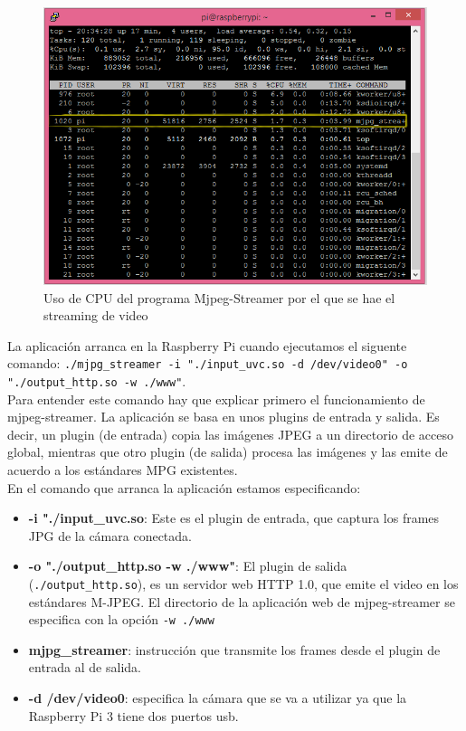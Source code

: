 \documentclass[twoside, 11pt]{epstfg}
\begin{document}
\begin{figure}[h!]
	\centerline{
		\mbox{\includegraphics[width=.80\textwidth]{images/UsoCPUMjpeg.png}}
	}
	\caption{Uso de CPU del programa Mjpeg-Streamer por el que se hae el streaming de video}
	\label{mjpeg}
\end{figure}

La aplicación arranca en la Raspberry Pi cuando ejecutamos el siguente comando: \texttt{./mjpg\_streamer -i "./input\_uvc.so -d /dev/video0" -o "./output\_http.so -w ./www"}.\\Para entender este comando hay que explicar primero el funcionamiento de mjpeg-streamer. La aplicación se basa en unos plugins de entrada y salida. Es decir, un plugin (de entrada) copia las imágenes JPEG a un directorio de acceso global, mientras que otro plugin (de salida) procesa las imágenes y las emite de acuerdo a los estándares MPG existentes.\\ En el comando que arranca la aplicación estamos especificando:
\begin{itemize}
	\item \textbf{ -i "./input\_uvc.so}: Este es el plugin de entrada, que captura los frames JPG de la cámara conectada.
	\item \textbf{-o "./output\_http.so -w ./www"}: El plugin de salida (\texttt{./output\_http.so}), es un servidor web HTTP 1.0, que emite el video en los estándares M-JPEG. El directorio de la aplicación web de mjpeg-streamer se especifica con la opción \texttt{-w ./www}
	\item \textbf{mjpg\_streamer}: instrucción que transmite los frames desde el plugin de entrada al de salida.
	\item \textbf{-d /dev/video0}: especifica la cámara que se va a utilizar ya que la Raspberry Pi 3 tiene dos puertos usb.
\end{itemize}
\end{document}
